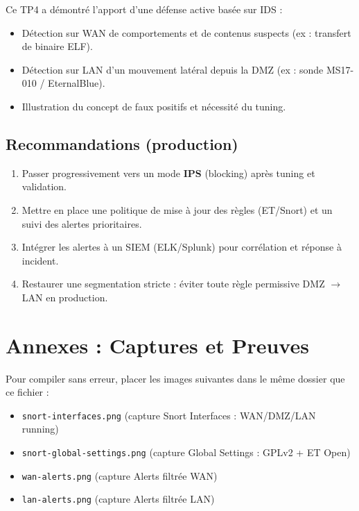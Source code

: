 \documentclass[12pt,a4paper,openany]{report}
\begin{document}
	Ce TP4 a démontré l'apport d'une défense active basée sur IDS :
	\begin{itemize}
		\item Détection sur WAN de comportements et de contenus suspects (ex : transfert de binaire ELF).
		\item Détection sur LAN d'un mouvement latéral depuis la DMZ (ex : sonde MS17-010 / EternalBlue).
		\item Illustration du concept de faux positifs et nécessité du tuning.
	\end{itemize}
	
	\section{Recommandations (production)}
	
	\begin{enumerate}[leftmargin=*]
		\item Passer progressivement vers un mode \textbf{IPS} (blocking) après tuning et validation.
		\item Mettre en place une politique de mise à jour des règles (ET/Snort) et un suivi des alertes prioritaires.
		\item Intégrer les alertes à un SIEM (ELK/Splunk) pour corrélation et réponse à incident.
		\item Restaurer une segmentation stricte : éviter toute règle permissive DMZ $\rightarrow$ LAN en production.
	\end{enumerate}
	
	\appendix
	\chapter{Annexes : Captures et Preuves}
	
	\begin{tcolorbox}[colback=primary!5!white, colframe=primary, title=\textbf{Fichiers requis dans le dossier du projet LaTeX}]
		Pour compiler sans erreur, placer les images suivantes dans le même dossier que ce fichier :
		\begin{itemize}
			\item \texttt{snort-interfaces.png} (capture Snort Interfaces : WAN/DMZ/LAN running)
			\item \texttt{snort-global-settings.png} (capture Global Settings : GPLv2 + ET Open)
						\item \texttt{wan-alerts.png} (capture Alerts filtrée WAN)
			\item \texttt{lan-alerts.png} (capture Alerts filtrée LAN)
			\end{itemize}
		\end{tcolorbox}
	
\end{document}
